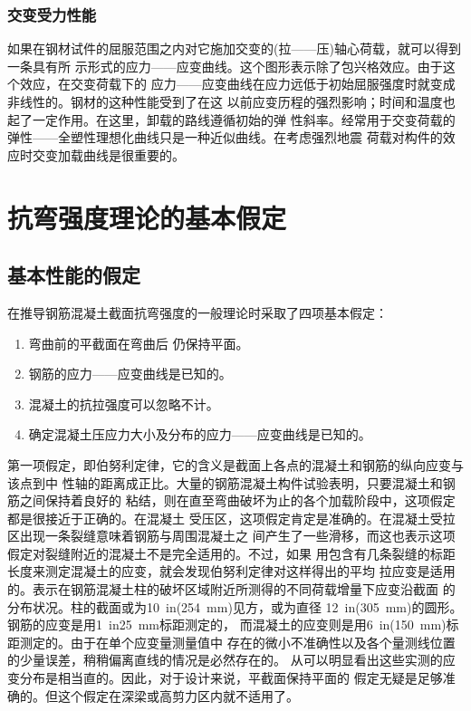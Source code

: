 \documentclass[12pt,a4paper]{book}
\begin{document}
\subsection{交变受力性能}

如果在钢材试件的屈服范围之内对它施加交变的(拉——压)轴心荷载，就可以得到一条具有所
示形式的应力——应变曲线。这个图形表示除了包兴格效应。由于这个效应，在交变荷载下的
应力——应变曲线在应力远低于初始屈服强度时就变成非线性的。钢材的这种性能受到了在这
以前应变历程的强烈影响；时间和温度也起了一定作用。在这里，卸载的路线遵循初始的弹
性斜率。经常用于交变荷载的弹性——全塑性理想化曲线只是一种近似曲线。在考虑强烈地震
荷载对构件的效应时交变加载曲线是很重要的。

\begin{figure}[htbp] \centering
\end{figure}

\chapter{抗弯强度理论的基本假定}

\section{基本性能的假定}

在推导钢筋混凝土截面抗弯强度的一般理论时采取了四项基本假定：
\begin{enumerate}
\item 弯曲前的平截面在弯曲后 仍保持平面。
\item 钢筋的应力——应变曲线是已知的。
\item 混凝土的抗拉强度可以忽略不计。
\item 确定混凝土压应力大小及分布的应力——应变曲线是已知的。
\end{enumerate}

第一项假定，即伯努利定律，它的含义是截面上各点的混凝土和钢筋的纵向应变与该点到中
性轴的距离成正比。大量的钢筋混凝土构件试验表明，只要混凝土和钢筋之间保持着良好的
粘结，则在直至弯曲破坏为止的各个加载阶段中，这项假定都是很接近于正确的。在混凝土
受压区，这项假定肯定是准确的。在混凝土受拉区出现一条裂缝意味着钢筋与周围混凝土之
间产生了一些滑移，而这也表示这项假定对裂缝附近的混凝土不是完全适用的。不过，如果
用包含有几条裂缝的标距长度来测定混凝土的应变，就会发现伯努利定律对这样得出的平均
拉应变是适用的。表示在钢筋混凝土柱的破坏区域附近所测得的不同荷载增量下应变沿截面
的分布状况。柱的截面或为\SI{10}{in}(\SI{254}{mm})见方，或为直径
\SI{12}{in}(\SI{305}{mm})的圆形。钢筋的应变是用\SI{1}{in}{\SI{25}{mm}}标距测定的，
而混凝土的应变则是用\SI{6}{in}(\SI{150}{mm})标距测定的。由于在单个应变量测量值中
存在的微小不准确性以及各个量测线位置的少量误差，稍稍偏离直线的情况是必然存在的。
从可以明显看出这些实测的应变分布是相当直的。因此，对于设计来说，平截面保持平面的
假定无疑是足够准确的。但这个假定在深梁或高剪力区内就不适用了。
\end{document}

